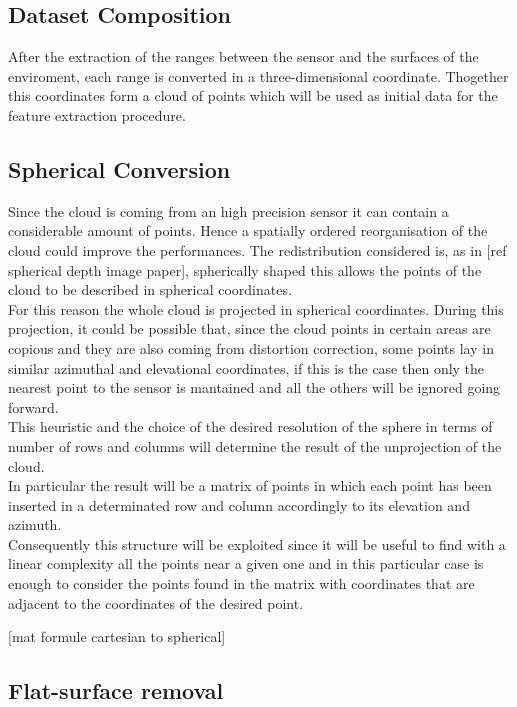 \subsection{Dataset Composition}
After the extraction of the ranges between the sensor and the surfaces of the enviroment, each range is converted in a three-dimensional coordinate.
Thogether this coordinates form a cloud of points which will be used as initial data for the feature extraction procedure.


\subsection{Spherical Conversion}
Since the cloud is coming from an high precision sensor it can contain a considerable amount of points.
Hence a spatially ordered reorganisation of the cloud could improve the performances. The redistribution considered is, as in [ref spherical depth image paper], spherically shaped this allows the points of the cloud to be described in spherical coordinates.\\
For this reason the whole cloud is projected in spherical coordinates. During this projection, it could be possible that, since the cloud points in certain areas are copious and they are also coming from distortion correction, some points lay in similar azimuthal and elevational coordinates, if this is the case then only the nearest point to the sensor is mantained and all the others will be ignored going forward.\\
This heuristic and the choice of the desired resolution of the sphere in terms of number of rows and columns will determine the result of the unprojection of the cloud.\\
In particular the result will be a matrix of points in which each point has been inserted in a determinated row and column accordingly to its elevation and azimuth.\\
Consequently this structure will be exploited since it will be useful to find with a linear complexity all the points near a given one and in this particular case is enough to consider the points found in the matrix with coordinates that are adjacent to the coordinates of the desired point.

[mat formule cartesian to spherical]

\subsection{ Flat-surface removal}


